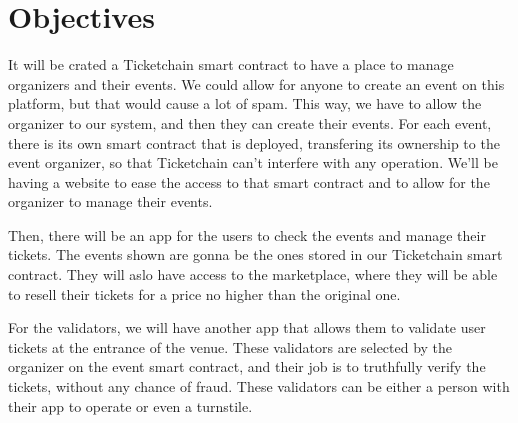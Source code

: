 \section{Objectives}

It will be crated a Ticketchain smart contract to have a place to manage organizers and their events. We could allow for anyone to create an event on this platform, but that would cause a lot of spam. This way, we have to allow the organizer to our system, and then they can create their events. For each event, there is its own smart contract that is deployed, transfering its ownership to the event organizer, so that Ticketchain can't interfere with any operation. We'll be having a website to ease the access to that smart contract and to allow for the organizer to manage their events.

Then, there will be an app for the users to check the events and manage their tickets. The events shown are gonna be the ones stored in our Ticketchain smart contract. They will aslo have access to the marketplace, where they will be able to resell their tickets for a price no higher than the original one.

For the validators, we will have another app that allows them to validate user tickets at the entrance of the venue. These validators are selected by the organizer on the event smart contract, and their job is to truthfully verify the tickets, without any chance of fraud. These validators can be either a person with their app to operate or even a turnstile.
